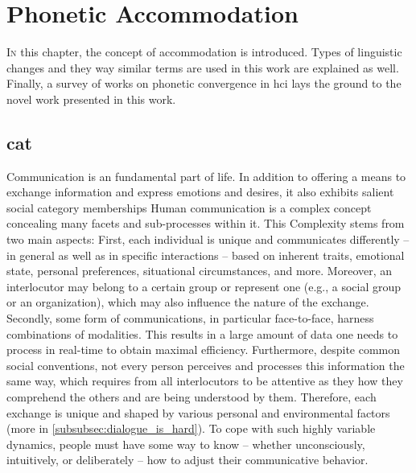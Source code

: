 \chapter{Phonetic Accommodation}
\label{chap:phonetic_convergence}

\lettrine{I}{n} this chapter, the concept of accommodation is introduced.
Types of linguistic changes and they way similar terms are used in this work are explained as well.
Finally, a survey of works on phonetic convergence in \acl{hci} lays the ground to the novel work presented in this work.

\pagebreak

\section{\Acl{cat}}
\label{sec:communication_accommodation_theory}

Communication is an fundamental part of life.
In addition to offering a means to exchange information and express emotions and desires, it also exhibits salient social category memberships
Human communication is a complex concept concealing many facets and sub-processes within it.
This Complexity stems from two main aspects:
First, each individual is unique and communicates differently -- in general as well as in specific interactions -- based on inherent traits, emotional state, personal preferences, situational circumstances, and more.
Moreover, an interlocutor may belong to a certain group or represent one (e.g., a social group or an organization), which may also influence the nature of the exchange.
Secondly, some form of communications, in particular face-to-face, harness combinations of modalities.
This results in a large amount of data one needs to process in real-time to obtain maximal efficiency.
Furthermore, despite common social conventions, not every person perceives and processes this information the same way, which requires from all interlocutors to be attentive as they how they comprehend the others and are being understood by them.
Therefore, each exchange is unique and shaped by various personal and environmental factors (more in  \cref{subsubsec:dialogue_is_hard}).
To cope with such highly variable dynamics, people must have some way to know -- whether unconsciously, intuitively, or deliberately -- how to adjust their communicative behavior.

